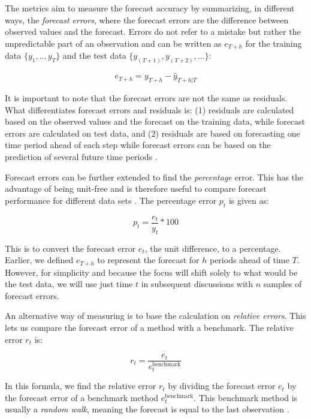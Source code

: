 \documentclass[12pt,a4paper]{article}
\begin{document}
The metrics aim to measure the forecast accuracy by summarizing, in different ways, the \textit{forecast errors}, where the forecast errors are the difference between observed values and the forecast. Errors do not refer to a mistake but rather the unpredictable part of an observation and can be written as $e_{T+h}$ for the training data $ \{{y_1,..,y_T\}}$ and the test data $\{{y_{(T+1)},y_{(T+2)},\ldots}\}$:

\begin{equation}
  e_{T+h} = y_{T+h} - \hat{y}_{T+h|T}
\end{equation}

It is important to note that the forecast errors are not the same as residuals. What differentiates forecast errors and residuals is: (1) residuals are calculated based on the observed values and the forecast on the training data, while forecast errors are calculated on test data, and (2) residuals are based on forecasting one time period ahead of each step while forecast errors can be based on the prediction of several future time periods \parencite{HyndmanForecasting2021}. 

Forecast errors can be further extended to find the \textit{percentage} error. This has the advantage of being unit-free and is therefore useful to compare forecast performance for different data sets \parencite{HyndmanForecasting2021}. The percentage error $p_t$ is given as:

\begin{equation}
  p_t = \frac{e_t}{y_t} \ast 100
  \label{percentageerror}
\end{equation}

This is to convert the forecast error $e_t$, the unit difference, to a percentage. Earlier, we defined $e_{T+h}$ to represent the forecast for $h$ periods ahead of time $T$. However, for simplicity and because the focus will shift solely to what would be the test data, we will use just time $t$ in subsequent discussions with $n$ samples of forecast errors. 

An alternative way of measuring is to base the calculation on \textit{relative errors}. This lets us compare the forecast error of a method with a benchmark. The relative error $r_t$ is: 

\begin{equation}
  r_t = \frac{e_t}{e_t^{\text{benchmark}}}
\end{equation}

In this formula, we find the relative error $r_t$ by dividing the forecast error $e_t$ by the forecast error of a benchmark method ${e_t^{\text{benchmark}}}$. This benchmark method is usually a \textit{random walk}, meaning the forecast is equal to the last observation \parencite[683]{HyndmanAccuracy2006}. 
\end{document}
